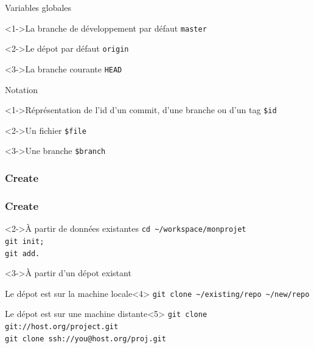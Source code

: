 	\begin{frame}[fragile]{Variables globales}
		\begin{block}<1->{La branche de développement par défaut}
			\verb'master'
		\end{block}
		\begin{block}<2->{Le dépot par défaut}
			\verb'origin'
		\end{block}
		\begin{block}<3->{La branche courante}
			\verb'HEAD'
		\end{block}
	\end{frame}
	

	
	\begin{frame}[fragile]{Notation}
		\begin{block}<1->{Réprésentation de l'id d'un commit, d'une branche ou d'un tag}
			\verb'$id'
		\end{block}
		\begin{block}<2->{Un fichier}
			\verb'$file'
		\end{block}
		\begin{block}<3->{Une branche}
			\verb'$branch'
		\end{block}
	\end{frame}

	\subsubsection{Create}
		\begin{frame}[fragile]
			\frametitle{Create}
			\begin{block}<2->{À partir de données existantes}
				\verb'cd ~/workspace/monprojet'\\
				\verb'git init;'\\
				\verb'git add.'
			\end{block}
			\begin{block}<3->{À partir d'un dépot existant}
				\begin{exampleblock}{Le dépot est sur la machine locale}<4>
					\verb'git clone ~/existing/repo ~/new/repo'\\
				\end{exampleblock}

				\begin{exampleblock}{Le dépot est sur une machine distante}<5>
					\verb'git clone git://host.org/project.git'\\
					\verb'git clone ssh://you@host.org/proj.git'
				\end{exampleblock}
			\end{block}

		\end{frame}
		
